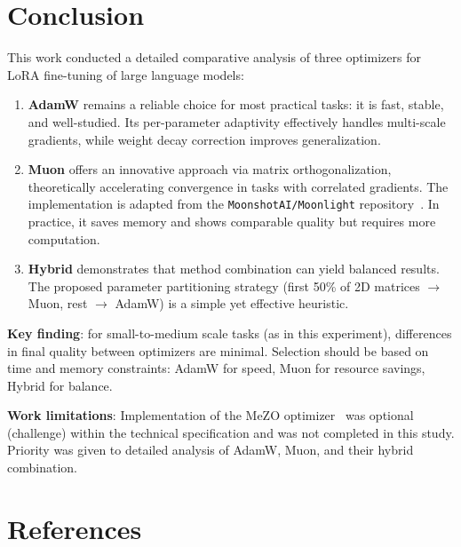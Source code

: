 \documentclass[a4paper,12pt]{article}
\begin{document}
\section{Conclusion}
\label{sec:conclusion}

This work conducted a detailed comparative analysis of three optimizers for LoRA fine-tuning of large language models:

\begin{enumerate}
    \item \textbf{AdamW} remains a reliable choice for most practical tasks: it is fast, stable, and well-studied. Its per-parameter adaptivity effectively handles multi-scale gradients, while weight decay correction improves generalization.
    
    \item \textbf{Muon} offers an innovative approach via matrix orthogonalization, theoretically accelerating convergence in tasks with correlated gradients. The implementation is adapted from the \texttt{MoonshotAI/Moonlight} repository~\cite{moonshot2024muon}. In practice, it saves memory and shows comparable quality but requires more computation.
    
    \item \textbf{Hybrid} demonstrates that method combination can yield balanced results. The proposed parameter partitioning strategy (first 50\% of 2D matrices $\rightarrow$ Muon, rest $\rightarrow$ AdamW) is a simple yet effective heuristic.
\end{enumerate}

\textbf{Key finding}: for small-to-medium scale tasks (as in this experiment), differences in final quality between optimizers are minimal. Selection should be based on time and memory constraints: AdamW for speed, Muon for resource savings, Hybrid for balance.

\textbf{Work limitations}: Implementation of the MeZO optimizer~\cite{mezo2023} was optional (challenge) within the technical specification and was not completed in this study. Priority was given to detailed analysis of AdamW, Muon, and their hybrid combination.

\section*{References}
\label{sec:references}
\end{document}
